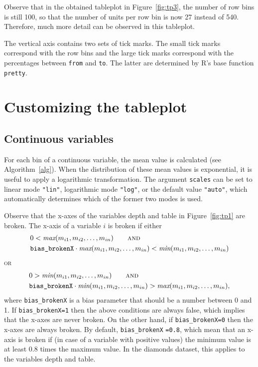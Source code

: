 \documentclass[11pt, fleqn, a4paper]{article}\usepackage{graphicx, color}
\begin{document}
Observe that in the obtained tableplot in Figure~\ref{fig:tp3}, the number of row bins is still 100, so that the number of units per row bin is now 27 instead of 540. Therefore, much more detail can be observed in this tableplot.

The vertical axis contains two sets of tick marks. The small tick marks correspond with the row bins and the large tick marks correspond with the percentages between {\tt from} and {\tt to}. The latter are determined by R's base function {\tt pretty}.


\section{Customizing the tableplot}


\subsection{Continuous variables}

For each bin of a continuous variable, the mean value is calculated (see Algorithm~\ref{alg}).
When the distribution of these mean values is exponential, it is useful to apply a logarithmic transformation. The argument {\tt scales} can be set to linear mode {\tt "lin"}, logarithmic mode {\tt "log"}, or the default value {\tt "auto"}, which automatically determines which of the former two modes is used.

Observe that the x-axes of the variables depth and table in Figure~\ref{fig:tp1} are broken. The x-axis of a variable $i$ is broken if
either
\begin{align*}
& 0 < \textit{max}(m_{i1}, m_{i2},\ldots, m_{in}) \qquad \textsc{and}\\
& \mbox{{\tt bias\_brokenX}} \cdot \textit{max}(m_{i1}, m_{i2},\ldots, m_{in}) < \textit{min}(m_{i1}, m_{i2},\ldots, m_{in}) 
\end{align*}
\textsc{or}
\begin{align*}
& 0 > \textit{min}(m_{i1}, m_{i2},\ldots, m_{in}) \qquad \textsc{and}\\
& \mbox{{\tt bias\_brokenX}} \cdot \textit{min}(m_{i1}, m_{i2},\ldots, m_{in}) > \textit{max}(m_{i1}, m_{i2},\ldots, m_{in}),
\end{align*}
where {\tt bias\_brokenX} is a bias parameter that should be a number between 0 and 1. If {\tt bias\_brokenX=1} then the above conditions are always false, which implies that the x-axes are never broken. On the other hand, if {\tt bias\_brokenX=0} then the x-axes are always broken. By default, {\tt bias\_brokenX} {\tt=0.8}, which mean that an x-axis is broken if (in case of a variable with positive values) the minimum value is at least 0.8 times the maximum value. In the diamonds dataset, this applies to the variables depth and table.
\end{document}

